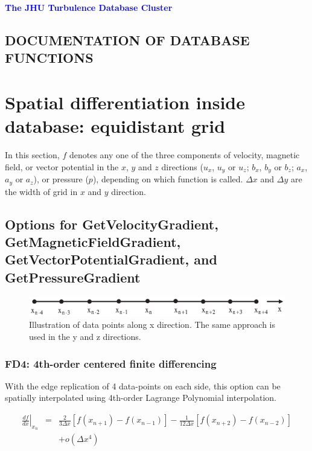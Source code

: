 \documentclass[11pt]{article}
\def\bea{\begin{eqnarray}}
\def\eea{\end{eqnarray}}
\begin{document}
\begin{center}
{\bf \Large \textcolor{blue}{ The JHU Turbulence Database Cluster}}
 \end{center}
 \vskip 1cm
\subsection*{DOCUMENTATION OF DATABASE FUNCTIONS}

\vskip 0.5cm
\section{Spatial differentiation inside database: equidistant grid}

In this section, $f$ denotes any one of the three components of
velocity, magnetic field, or vector potential in the $x$, $y$ and $z$ directions ($u_x$, $u_y$ or $u_z$; $b_x$, $b_y$ or $b_z$; $a_x$, $a_y$ or $a_z$), or pressure ($p$), depending on which function is called. $\Delta x$ and $\Delta y$ are the width of grid in $x$ and $y$ direction.

\subsection{Options for GetVelocityGradient, GetMagneticFieldGradient, GetVectorPotentialGradient, and GetPressureGradient}

\begin{figure}[h]
\begin{minipage}{\linewidth}
\centering\includegraphics[width=1.0\linewidth]{1DGrid.eps}
\end{minipage} \caption{Illustration of data points along x direction. The same approach is used in the y and z directions.}\label{1DGrid}
\end{figure}

\subsubsection*{FD4: 4th-order centered finite differencing}
\label{sec-FD4}

With the edge replication of 4 data-points on each side, this option can be spatially interpolated using 4th-order Lagrange Polynomial interpolation.

\bea \left.\frac{df}{dx}\right|_{x_n}
&=& \frac{2}{3\Delta x}[f(x_{n+1})-f(x_{n-1})]-\frac{1}{12\Delta
x}[f(x_{n+2})-f(x_{n-2})]\nonumber\\
&&+o(\Delta x^4) \eea
\end{document}
